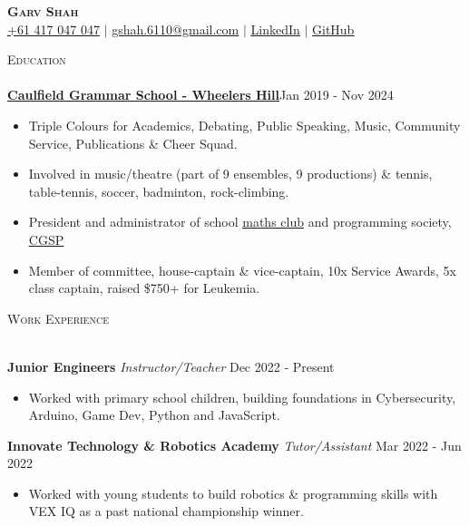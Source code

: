\documentclass[a4paper]{article}
\newcommand{\lineunder} {
    \vspace*{-8pt} \\
    \hspace*{-10pt} \hrulefill \\
}
\newcommand{\header} [1] {
    {\hspace*{-10pt}\vspace*{6pt} \textsc{#1}}
    \vspace*{-6pt} \lineunder
}
\begin{document}

\begin{center}
    \textbf{\Huge \scshape Garv Shah} \\ \vspace{1pt}
    \small \href{tel:+61417047047}{+61 417 047 047} $|$ \href{mailto:gshah.6110@gmail.com}{gshah.6110@gmail.com} $|$
    \href{https://www.linkedin.com/in/garvshah/}{\ul{LinkedIn}} $|$
    \href{https://garv-shah.github.io/}{\ul{GitHub}}
\end{center}
\vspace{-2mm}

\header{Education}
\href{https://www.caulfieldgs.vic.edu.au/wheelers-hill/}{\textbf{\ul{Caulfield Grammar School - Wheelers Hill}}}\hfill Jan 2019 - Nov 2024\\
\vspace{-2mm}
\begin{itemize} \itemsep 1pt
	\item Triple Colours for Academics, Debating, Public Speaking, Music, Community Service, Publications \& Cheer Squad.
        \item Involved in music/theatre (part of 9 ensembles, 9 productions) \& tennis, table-tennis, soccer, badminton, rock-climbing.
        \item President and administrator of school \href{https://cgs-math.github.io/}{\ul{maths club}} and programming society, \href{https://cgs-programming.github.io}{\ul{CGSP}}
        \item Member of committee, house-captain \& vice-captain, 10x Service Awards, 5x class captain, raised \$750+ for Leukemia.
\end{itemize}

\header{Work Experience}
\vspace{1mm}

\textbf{Junior Engineers} \textit{Instructor/Teacher} \hfill Dec 2022 - Present\\
\vspace{-3mm}
\begin{itemize} \itemsep 0.5pt
    \item Worked with primary school children, building foundations in Cybersecurity, Arduino, Game Dev, Python and JavaScript.
\end{itemize}
\vspace{-2mm}

\textbf{Innovate Technology \& Robotics Academy} \textit{Tutor/Assistant} \hfill Mar 2022 - Jun 2022\\
\vspace{-3mm}
\begin{itemize} \itemsep 0.5pt
	\item Worked with young students to build robotics \& programming skills with VEX IQ as a past national championship winner.
\end{itemize}
\vspace{-2mm}
\end{document}
